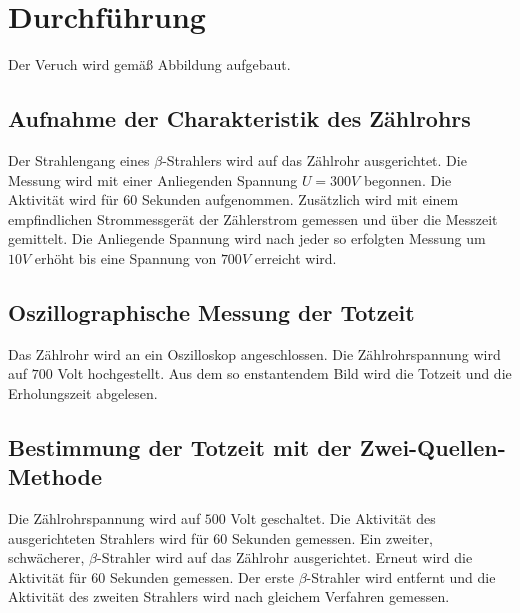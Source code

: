 \section{Durchführung}
\label{sec:Durchführung}
Der Veruch wird gemäß Abbildung aufgebaut.
\subsection{Aufnahme der Charakteristik des Zählrohrs}
Der Strahlengang eines $\beta$-Strahlers wird auf das Zählrohr ausgerichtet.
Die Messung wird mit einer Anliegenden Spannung $U= 300 V$ begonnen.
Die Aktivität wird für $60$ Sekunden aufgenommen.
Zusätzlich wird mit einem empfindlichen Strommessgerät der Zählerstrom gemessen und über die Messzeit gemittelt.
Die Anliegende Spannung wird nach jeder so erfolgten Messung um $10 V$ erhöht bis eine Spannung von $700 V$ erreicht wird.
\subsection{Oszillographische Messung der Totzeit}
Das Zählrohr wird an ein Oszilloskop angeschlossen.
Die Zählrohrspannung wird auf $700$ Volt hochgestellt.
Aus dem so enstantendem Bild wird die Totzeit und die Erholungszeit abgelesen.
\subsection{Bestimmung der Totzeit mit der Zwei-Quellen-Methode}
Die Zählrohrspannung wird auf $500$ Volt geschaltet.
Die Aktivität des ausgerichteten Strahlers wird für $60$ Sekunden gemessen.
Ein zweiter, schwächerer, $\beta$-Strahler wird auf  das Zählrohr ausgerichtet.
Erneut wird die Aktivität für $60$ Sekunden gemessen.
Der erste $\beta$-Strahler wird entfernt und die Aktivität des zweiten Strahlers wird nach gleichem Verfahren gemessen.
